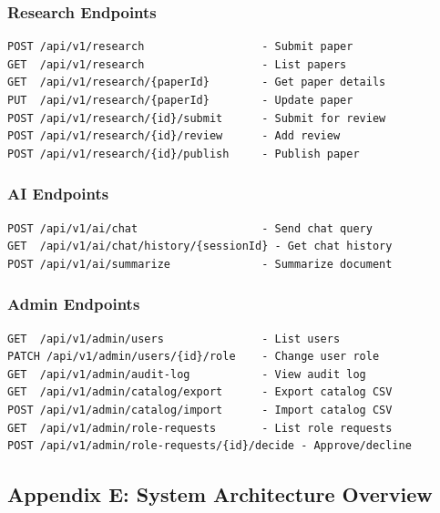 \documentclass[12pt,a4paper]{article}
\begin{document}
\subsubsection{Research Endpoints}
\begin{verbatim}
POST /api/v1/research                  - Submit paper
GET  /api/v1/research                  - List papers
GET  /api/v1/research/{paperId}        - Get paper details
PUT  /api/v1/research/{paperId}        - Update paper
POST /api/v1/research/{id}/submit      - Submit for review
POST /api/v1/research/{id}/review      - Add review
POST /api/v1/research/{id}/publish     - Publish paper
\end{verbatim}

\subsubsection{AI Endpoints}
\begin{verbatim}
POST /api/v1/ai/chat                   - Send chat query
GET  /api/v1/ai/chat/history/{sessionId} - Get chat history
POST /api/v1/ai/summarize              - Summarize document
\end{verbatim}

\subsubsection{Admin Endpoints}
\begin{verbatim}
GET  /api/v1/admin/users               - List users
PATCH /api/v1/admin/users/{id}/role    - Change user role
GET  /api/v1/admin/audit-log           - View audit log
GET  /api/v1/admin/catalog/export      - Export catalog CSV
POST /api/v1/admin/catalog/import      - Import catalog CSV
GET  /api/v1/admin/role-requests       - List role requests
POST /api/v1/admin/role-requests/{id}/decide - Approve/decline
\end{verbatim}

\newpage

\subsection{Appendix E: System Architecture Overview}
\end{document}
